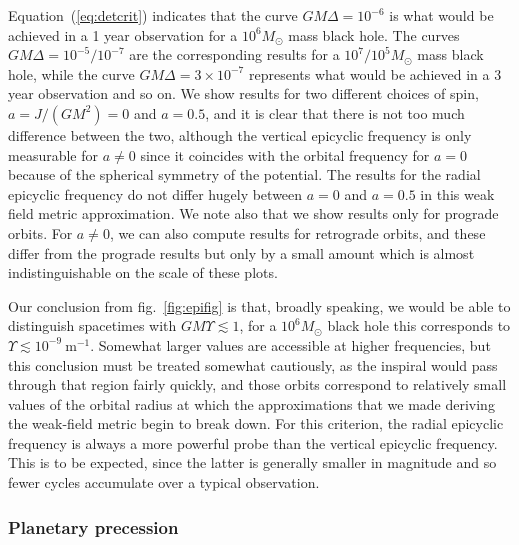 \documentclass[aps,prd,amsfonts,amssymb,amsmath,nofootinbib,reprint,showpacs]{revtex4-1}
\newcommand{\eqnref}[1]{(\ref{eq:#1})}
\newcommand{\figref}[1]{fig.\ \ref{fig:#1}}
\newcommand{\units}[1]{\ensuremath{~\mathrm{#1}}}
\begin{document}
Equation~\eqnref{detcrit} indicates that the curve $GM\Delta = 10^{-6}$ is what would be achieved in a 1 year observation for a $10^6M_\odot$ mass black hole. The curves $GM\Delta = 10^{-5}/10^{-7}$ are the corresponding results for a $10^7/10^5M_\odot$ mass black hole, while the curve $GM\Delta = 3\times10^{-7}$ represents what would be achieved in a 3 year observation and so on. We show results for two different choices of spin, $a = J/(GM^2) = 0$ and $a=0.5$, and it is clear that there is not too much difference between the two, although the vertical epicyclic frequency is only measurable for $a \neq 0$ since it coincides with the orbital frequency for $a=0$ because of the spherical symmetry of the potential. The results for the radial epicyclic frequency do not differ hugely between $a=0$ and $a=0.5$ in this weak field metric approximation. We note also that we show results only for prograde orbits. For $a \neq 0$, we can also compute results for retrograde orbits, and these differ from the prograde results but only by a small amount which is almost indistinguishable on the scale of these plots.

Our conclusion from \figref{epifig} is that, broadly speaking, we would be able to distinguish spacetimes with $GM\Upsilon \lesssim 1 $, for a $10^6 M_\odot$ black hole this corresponds to $\Upsilon \lesssim 10^{-9}\units{m^{-1}}$. Somewhat larger values are accessible at higher frequencies, but this conclusion must be treated somewhat cautiously, as the inspiral would pass through that region fairly quickly, and those orbits correspond to relatively small values of the orbital radius at which the approximations that we made deriving the weak-field metric begin to break down. For this criterion, the radial epicyclic frequency is always a more powerful probe than the vertical epicyclic frequency. This is to be expected, since the latter is generally smaller in magnitude and so fewer cycles accumulate over a typical observation.

\subsubsection{Planetary precession}
\end{document}
